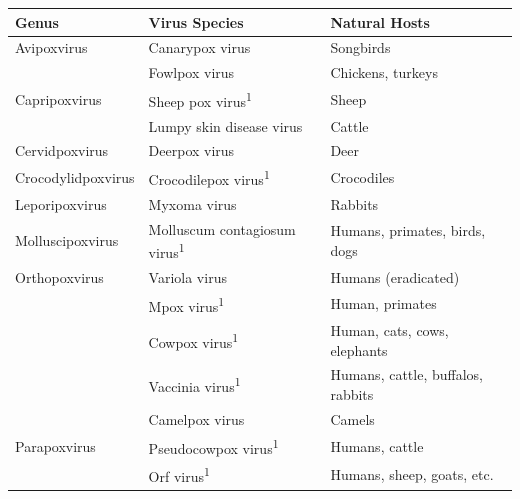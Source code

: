 \renewcommand{\arraystretch}{1.5}
\begin{table}[ht]
	\begin{tabular}{lll}
	\hline
	\textbf{Genus}      & \textbf{Virus Species}                          & \textbf{Natural Hosts}                      \\ \hline
	Avipoxvirus         & Canarypox virus                                 & Songbirds 									\\ 
						& Fowlpox virus                                   & Chickens, turkeys                           \\ \hline
	Capripoxvirus       & Sheep pox virus\textsuperscript{1}              & Sheep                                       \\
	                    & Lumpy skin disease virus                        & Cattle                                      \\ \hline
	Cervidpoxvirus      & Deerpox virus                                   & Deer                                        \\ \hline
	Crocodylidpoxvirus  & Crocodilepox virus\textsuperscript{1}           & Crocodiles                                  \\ \hline
	Leporipoxvirus      & Myxoma virus                                    & Rabbits                                     \\ \hline
	Molluscipoxvirus    & Molluscum contagiosum virus\textsuperscript{1}  & Humans, primates, birds, dogs               \\ \hline
	Orthopoxvirus       & Variola virus                                   & Humans (eradicated)                         \\ 
						& Mpox virus\textsuperscript{1}                   & Human, primates                             \\ 
						& Cowpox virus\textsuperscript{1}                 & Human, cats, cows, elephants                \\ 
						& Vaccinia virus\textsuperscript{1}               & Humans, cattle, buffalos, rabbits           \\ 
						& Camelpox virus                                  & Camels                                      \\ \hline
	Parapoxvirus        & Pseudocowpox virus\textsuperscript{1}           & Humans, cattle                              \\ 
						& Orf virus\textsuperscript{1}                    & Humans, sheep, goats, etc.                  \\ \hline

\end{tabular}
\end{table}
